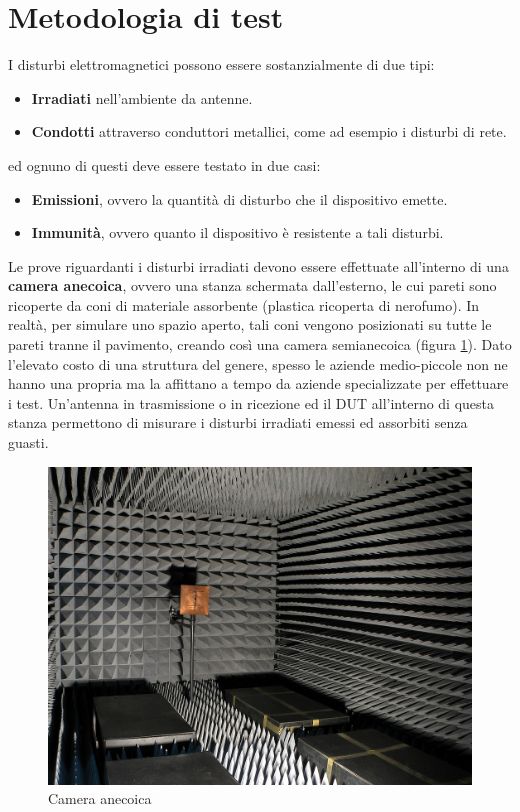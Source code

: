 \documentclass[11pt,4paper]{report}
\begin{document}
\section{Metodologia di test}
I disturbi elettromagnetici possono essere sostanzialmente di due tipi:
\begin{itemize}
\item \textbf{Irradiati} nell'ambiente da antenne.
\item \textbf{Condotti} attraverso conduttori metallici, come ad esempio i disturbi di rete.
\end{itemize}
ed ognuno di questi deve essere testato in due casi:
\begin{itemize}
\item \textbf{Emissioni}, ovvero la quantità di disturbo che il dispositivo emette.
\item \textbf{Immunità}, ovvero quanto il dispositivo è resistente a tali disturbi.
\end{itemize}

Le prove riguardanti i disturbi irradiati devono essere effettuate all'interno di una \textbf{camera anecoica}, ovvero una stanza schermata dall'esterno, le cui pareti sono ricoperte da coni di materiale assorbente (plastica ricoperta di nerofumo). In realtà, per simulare uno spazio aperto, tali coni vengono posizionati su tutte le pareti tranne il pavimento, creando così una camera semianecoica (figura \ref{fig:camera_anecoica}). Dato l'elevato costo di una struttura del genere, spesso le aziende medio-piccole non ne hanno una propria ma la affittano a tempo da aziende specializzate per effettuare i test. Un'antenna in trasmissione o in ricezione ed il DUT all'interno di questa stanza permettono di misurare i disturbi irradiati emessi ed assorbiti senza guasti.

\begin{figure}[hbtp]
	\centering
	\includegraphics[width=0.6\linewidth]{emc/camera_anecoica}
	\caption{Camera anecoica}
	\label{fig:camera_anecoica}
\end{figure}
\end{document}
